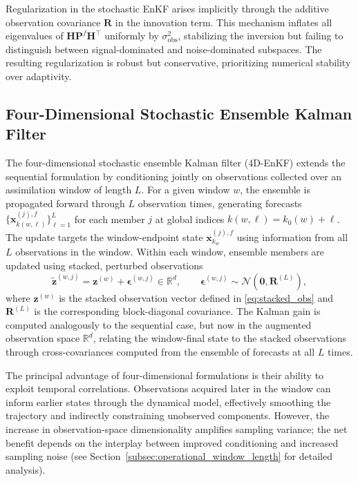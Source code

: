 \documentclass[11pt,a4paper]{article}
\begin{document}
Regularization in the stochastic EnKF arises implicitly through the additive observation covariance $\mathbf{R}$ in the innovation term. This mechanism inflates all eigenvalues of $\mathbf{H}\mathbf{P}^f\mathbf{H}^\top$ uniformly by $\sigma_{\mathrm{obs}}^2$, stabilizing the inversion but failing to distinguish between signal-dominated and noise-dominated subspaces. The resulting regularization is robust but conservative, prioritizing numerical stability over adaptivity.

\subsection{Four-Dimensional Stochastic Ensemble Kalman Filter}

The four-dimensional stochastic ensemble Kalman filter (4D-EnKF) \citep{hunt2004four,evensen2009book} extends the sequential formulation by conditioning jointly on observations collected over an assimilation window of length $L$. For a given window $w$, the ensemble is propagated forward through $L$ observation times, generating forecasts $\{\mathbf{x}_{k(w,\ell)}^{(j),f}\}_{\ell=1}^L$ for each member $j$ at global indices $k(w,\ell)=k_0(w)+\ell$. The update targets the window-endpoint state $\mathbf{x}_{k_w}^{(j),f}$ using information from all $L$ observations in the window. Within each window, ensemble members are updated using stacked, perturbed observations
\begin{equation}
\tilde{\mathbf{z}}^{(w,j)}
=
\mathbf{z}^{(w)}+\boldsymbol{\epsilon}^{(w,j)}\in \mathbb{R}^{d},
\qquad
\boldsymbol{\epsilon}^{(w,j)}\sim\mathcal{N}(\mathbf{0},\mathbf{R}^{(L)}),
\label{eq:4d_perturb}
\end{equation}
where $\mathbf{z}^{(w)}$ is the stacked observation vector defined in \eqref{eq:stacked_obs} and $\mathbf{R}^{(L)}$ is the corresponding block-diagonal covariance. The Kalman gain is computed analogously to the sequential case, but now in the augmented observation space $\mathbb{R}^{d}$, relating the window-final state to the stacked observations through cross-covariances computed from the ensemble of forecasts at all $L$ times.

The principal advantage of four-dimensional formulations is their ability to exploit temporal correlations. Observations acquired later in the window can inform earlier states through the dynamical model, effectively smoothing the trajectory and indirectly constraining unobserved components. However, the increase in observation-space dimensionality amplifies sampling variance; the net benefit depends on the interplay between improved conditioning and increased sampling noise (see Section~\ref{subsec:operational_window_length} for detailed analysis).
\end{document}
